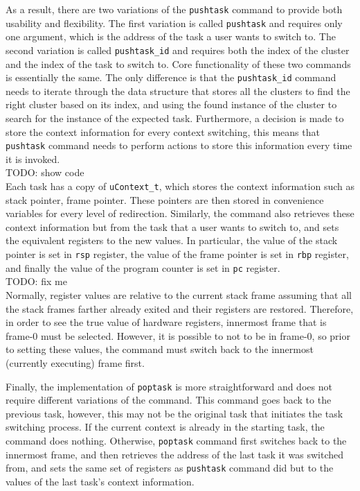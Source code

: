 As a result, there are two variations of the \verb|pushtask| command to provide both usability and flexibility. The first variation is called \verb|pushtask| and requires
only one argument, which is the address of the task a user wants to switch to.
The second variation is called \verb|pushtask_id| and requires both the index of
the cluster and the index of the task to switch to. Core functionality of these two commands is
essentially the same. The only difference is that the \verb|pushtask_id| command
needs to iterate through the data structure that stores all the clusters to find
the right cluster based on its index, and using the found instance of the
cluster to search for the instance of the expected task. Furthermore, a decision
is made to store the context information for every context switching, this means
that \verb|pushtask| command needs to perform actions to store this information every time it is
invoked.
\\
TODO: show code
\\

Each task has a copy of \verb|uContext_t|, which stores the context
information such as stack pointer, frame pointer. These pointers are then stored
in convenience variables for every level of redirection. Similarly, the command
also retrieves these context information but from the task that a user wants to switch to, and
sets the equivalent registers to the new values. In particular, the value of the stack
pointer is set in \verb|rsp| register, the value of the frame pointer is set in \verb|rbp|
register, and finally the value of the program counter is set in \verb|pc| register.
\\
TODO: fix me\\
Normally, register values are relative to the current stack frame assuming that
all the stack frames farther already exited and their registers are restored. Therefore, in
order to see the true value of hardware registers, innermost frame that is
frame-0 must be selected\cite{reference11}. However, it is possible to not to be in frame-0, so prior to setting these values,
the command must switch back to the innermost (currently executing) frame first.

Finally, the implementation of \verb|poptask| is more straightforward and does
not require different variations of the command. This command goes back to the previous task, however, this may not be the original
task that initiates the task switching process. If the current context is
already in the starting task, the command does nothing. Otherwise,
\verb|poptask| command first switches back to the innermost frame, and then
retrieves the
address of the last task it was switched from, and sets the same set of registers as
\verb|pushtask| command did but to the values of the last task's context
information.

